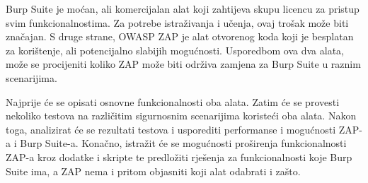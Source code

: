 Burp Suite je moćan, ali komercijalan alat koji zahtijeva skupu licencu za pristup svim funkcionalnostima. 
Za potrebe istraživanja i učenja, ovaj trošak može biti značajan. S druge strane, OWASP ZAP je alat otvorenog koda koji je besplatan 
za korištenje, ali potencijalno slabijih mogućnosti. Usporedbom ova dva alata, može se procijeniti koliko ZAP može biti održiva 
zamjena za Burp Suite u raznim scenarijima.

Najprije će se opisati osnovne funkcionalnosti oba alata. Zatim će se provesti nekoliko testova na različitim sigurnosnim scenarijima 
koristeći oba alata. Nakon toga, analizirat će se rezultati testova i usporediti performanse i mogućnosti ZAP-a i Burp Suite-a. 
Konačno, istražit će se mogućnosti proširenja funkcionalnosti ZAP-a kroz dodatke i skripte te predložiti rješenja za funkcionalnosti 
koje Burp Suite ima, a ZAP nema i pritom objasniti koji alat odabrati i zašto.